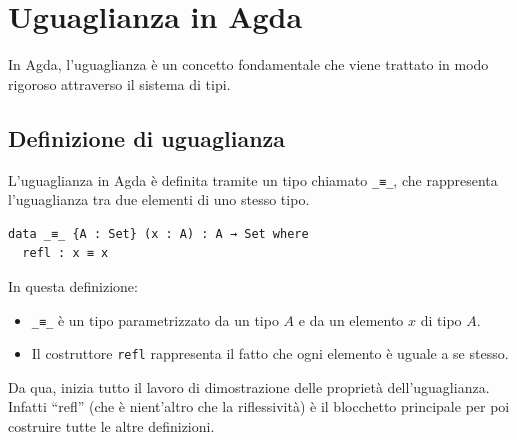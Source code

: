 \documentclass[a4paper]{article}
\theoremstyle{definition}
\theoremstyle{remark}
\begin{document}
\section{Uguaglianza in Agda}

In Agda, l'uguaglianza è un concetto fondamentale che viene trattato in modo rigoroso attraverso il sistema di tipi.

\subsection{Definizione di uguaglianza}

L'uguaglianza in Agda è definita tramite un tipo chiamato \texttt{\_≡\_}, che rappresenta l'uguaglianza tra due elementi di uno stesso tipo.
\begin{verbatim}
data _≡_ {A : Set} (x : A) : A → Set where
  refl : x ≡ x
\end{verbatim}
In questa definizione:
\begin{itemize}
  \item \texttt{\_≡\_} è un tipo parametrizzato da un tipo \( A \) e da un elemento \( x \) di tipo \( A \).
  \item Il costruttore \texttt{refl} rappresenta il fatto che ogni elemento è uguale a se stesso.
\end{itemize}
Da qua, inizia tutto il lavoro di dimostrazione delle proprietà dell'uguaglianza.
Infatti \enquote{refl} (che è nient'altro che la riflessività) è il blocchetto principale per poi costruire tutte le altre definizioni.
\end{document}

